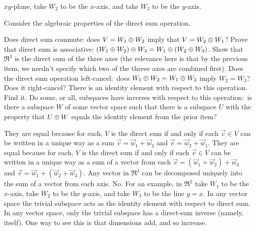 \begin{exercises}
\begin{answer}
\begin{exparts}
          \( xy \)-plane, take \( W_2 \) to be the \( x \)-axis, 
          and take \( W_3 \) to be the \( y \)-axis.  
      \end{exparts}
     \end{answer}
  \item 
    Consider the algebraic properties of the direct sum operation.
    \begin{exparts}
       \partsitem Does direct sum commute: does \( V=W_1\oplus W_2 \) imply
         that \( V=W_2\oplus W_1 \)?
      \partsitem Prove that direct sum is associative:
        \( (W_1\oplus W_2)\oplus W_3=
            W_1\oplus(W_2\oplus W_3) \).
       \partsitem Show that \( \Re^3 \) is the direct sum of the three axes
         (the relevance here is that by the previous item,
          we needn't specify which two of the threee axes are combined first).
       \partsitem Does the direct sum operation left-cancel:~does
         \( W_1\oplus W_2=W_1\oplus W_3 \) imply \( W_2=W_3 \)?
         Does it right-cancel?
       \partsitem There is an identity element with respect to this operation.
         Find it.
       \partsitem Do some, or all, subspaces have inverses with respect to this
         operation:~is there a subspace \( W \) of some vector space such
         that there is a subspace \( U \) with the property that
         \( U\oplus W \) equals the identity element from
         the prior item?
    \end{exparts}
    \begin{answer}
      \begin{exparts}
         \partsitem They are equal because for each, 
           \( V \) is the direct sum if
           and only if each \( \vec{v}\in V \) can be written in a unique
           way as a sum \( \vec{v}=\vec{w}_1+\vec{w}_2 \) and
           \( \vec{v}=\vec{w}_2+\vec{w}_1 \).
         \partsitem They are equal because for each, 
           \( V \) is the direct sum if
           and only if each \( \vec{v}\in V \) can be written in a unique
           way as a sum of a vector from each
           $\vec{v}=(\vec{w}_1+\vec{w}_2)+\vec{w}_3$
           and $\vec{v}=\vec{w}_1+(\vec{w}_2+\vec{w}_3)$.
         \partsitem Any vector in \( \Re^3 \) can be decomposed uniquely into
           the sum of a vector from each axis.
         \partsitem No.
           For an example, in \( \Re^2 \) take \( W_1 \) to be the
           \( x \)-axis, take \( W_2 \) to be the \( y \)-axis, and
           take \( W_3 \) to be the line \( y=x \).
         \partsitem In any vector space the trivial subspace acts as 
           the identity element with respect to direct sum.
         \partsitem In any vector space, only the trivial subspace has
           a direct-sum inverse (namely, itself).
           One way to see this is that dimensions add, and so increase.
      \end{exparts}  
     \end{answer}
\end{exercises}
